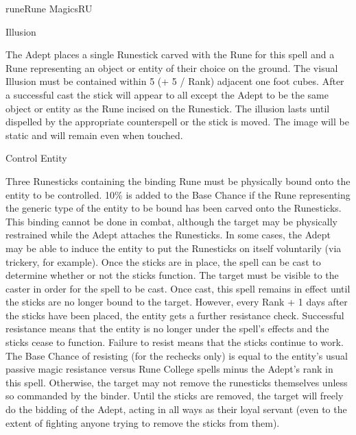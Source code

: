\begin{college}[1.1]{rune}{Rune Magics}{RU}
\begin{spell}[G-6]{Illusion}
\begin{effects}
The Adept places a single Runestick carved with the Rune for this
spell and a Rune representing an object or entity of their choice on
the ground.  The visual Illusion must be contained within 5 (+ 5 /
Rank) adjacent one foot cubes.  After a successful cast the stick will
appear to all except the Adept to be the same object or entity as the
Rune incised on the Runestick.  The illusion lasts until dispelled by
the appropriate counterspell or the stick is moved.  The image will be
static and will remain even when touched.
\end{effects}
\end{spell}

\begin{spell}[G-7]{Control Entity}

\begin{effects}
Three Runesticks containing the binding Rune must be physically bound
onto the entity to be controlled.  10\% is added to the Base Chance if
the Rune representing the generic type of the entity to be bound has
been carved onto the Runesticks. This binding cannot be done in
combat, although the target may be physically restrained while the
Adept attaches the Runesticks.  In some cases, the Adept may be able
to induce the entity to put the Runesticks on itself voluntarily (via
trickery, for example).  Once the sticks are in place, the spell can
be cast to determine whether or not the sticks function.  The target
must be visible to the caster in order for the spell to be cast.  Once
cast, this spell remains in effect until the sticks are no longer
bound to the target.  However, every Rank + 1 days after the sticks
have been placed, the entity gets a further resistance check.
Successful resistance means that the entity is no longer under the
spell's effects and the sticks cease to function.  Failure to resist
means that the sticks continue to work. The Base Chance of resisting
(for the rechecks only) is equal to the entity's usual passive magic
resistance versus Rune College spells minus the Adept's rank in this
spell.  Otherwise, the target may not remove the runesticks themselves
unless so commanded by the binder.  Until the sticks are removed, the
target will freely do the bidding of the Adept, acting in all ways as
their loyal servant (even to the extent of fighting anyone trying to
remove the sticks from them).
\end{effects}
\end{spell}


\end{college}
